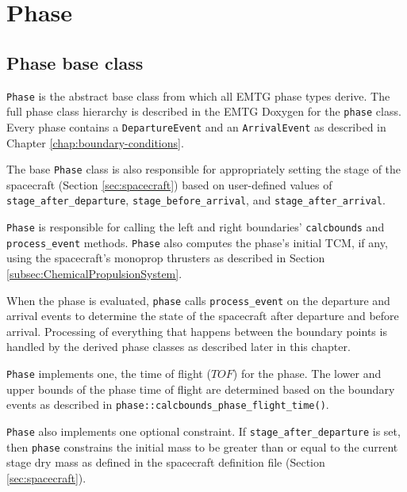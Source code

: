 



\chapter{Phase}
\label{chap:phase}

\section{Phase base class}
\label{sec:phase_base_class}

\texttt{Phase} is the abstract base class from which all \ac{EMTG} phase types derive. The full phase class hierarchy is described in the EMTG Doxygen for the \texttt{phase} class. Every phase contains a \texttt{DepartureEvent} and an \texttt{ArrivalEvent} as described in Chapter \ref{chap:boundary-conditions}.

The base \texttt{Phase} class is also responsible for appropriately setting the stage of the spacecraft (Section \ref{sec:spacecraft}) based on user-defined values of \texttt{stage\_after\_departure}, \texttt{stage\_before\_arrival}, and \texttt{stage\_after\_arrival}.

\texttt{Phase} is responsible for calling the left and right boundaries' \texttt{calcbounds} and \texttt{process\_event} methods. \texttt{Phase} also computes the phase's initial TCM, if any, using the spacecraft's monoprop thrusters as described in Section \ref{subsec:ChemicalPropulsionSystem}.

When the phase is evaluated, \texttt{phase} calls \texttt{process\_event} on the departure and arrival events to determine the state of the spacecraft after departure and before arrival. Processing of everything that happens between the boundary points is handled by the derived phase classes as described later in this chapter.

\texttt{Phase} implements one, the time of flight ($TOF$) for the phase. The lower and upper bounds of the phase time of flight are determined based on the boundary events as described in \texttt{phase::calcbounds\_phase\_flight\_time()}.

\texttt{Phase} also implements one optional constraint. If \texttt{stage\_after\_departure} is set, then \texttt{phase} constrains the initial mass to be greater than or equal to the current stage dry mass as defined in the spacecraft definition file (Section \ref{sec:spacecraft}).

